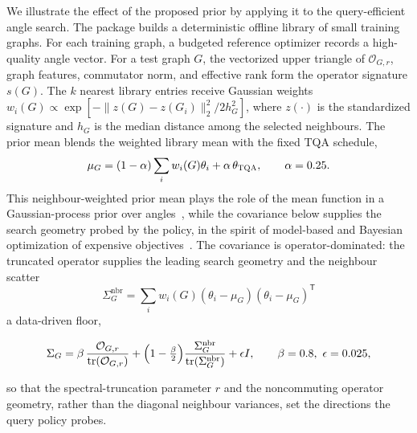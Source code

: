 \documentclass[aps,prxquantum,reprint,amsmath,amssymb,floatfix,nofootinbib,superscriptaddress,longbibliography]{revtex4-2}
\theoremstyle{remark}
\newcommand{\TQA}{\textnormal{\textsc{TQA}}}
\newcommand{\calO}{\mathcal{O}}
\begin{document}
We illustrate the effect of the proposed prior by applying it to the
query-efficient angle search.  The package builds a deterministic offline library
of small training graphs.  For each training graph, a budgeted reference optimizer
records a high-quality angle vector.  For a test graph \(G\), the vectorized upper
triangle of \(\calO_{G,r}\), graph features, commutator norm, and effective rank
form the operator signature \(s(G)\).  The \(k\) nearest library entries receive
Gaussian weights \(w_i(G)\propto\exp[-\|z(G)-z(G_i)\|_2^2/2h_G^2]\), where
\(z(\cdot)\) is the standardized signature and \(h_G\) is the median distance
among the selected neighbours.  The prior mean blends the weighted library mean
with the fixed \TQA{} schedule,
\begin{equation}
    \mu_G=(1-\alpha)\sum_i w_i(G)\theta_i+\alpha\,\theta_{\TQA},
    \qquad \alpha=0.25.
\end{equation}
This neighbour-weighted prior mean plays the role of the mean function in a
Gaussian-process prior over angles~\cite{rasmussen2006}, while the covariance
below supplies the search geometry probed by the policy, in the spirit of
model-based and Bayesian optimization of expensive
objectives~\cite{shahriari2016,sung2020}.
The covariance is operator-dominated: the truncated operator supplies the leading
search geometry and the neighbour scatter
\begin{equation}
    \Sigma_G^{\mathrm{nbr}}=\sum_i w_i(G)(\theta_i-\mu_G)(\theta_i-\mu_G)^{\mathsf T}
\end{equation}
a data-driven floor,
\begin{widetext}
\begin{equation}
    \Sigma_G =
    \beta\,\frac{\calO_{G,r}}{\operatorname{tr}(\calO_{G,r})}
    +\Bigl(1-\tfrac{\beta}{2}\Bigr)\frac{\Sigma_G^{\mathrm{nbr}}}{\operatorname{tr}(\Sigma_G^{\mathrm{nbr}})}
    +\epsilon I,
    \qquad \beta=0.8,\ \epsilon=0.025,
    \label{eq:covariance}
\end{equation}
\end{widetext}
so that the spectral-truncation parameter \(r\) and the noncommuting operator
geometry, rather than the diagonal neighbour variances, set the directions the
query policy probes.
\end{document}
